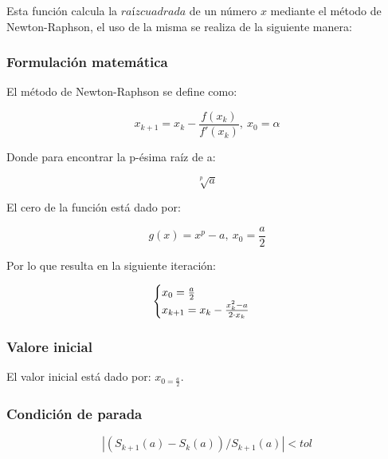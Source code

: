 \documentclass[10pt,a4paper]{article}
\begin{document}
	Esta función calcula la $raíz cuadrada$ de un número $x$ mediante el método de Newton-Raphson, el uso de la misma se realiza de la siguiente manera:
	
	\begin{center}
	\end{center}
	
	\subsubsection{Formulación matemática}
	
	El método de Newton-Raphson se define como:
	
	\begin{equation}\label{key19}
		x_{k+1} = x_{k} - \frac{f(x_{k})}{f'(x_{k})}, ~x_{0} = \alpha
	\end{equation}
	
	Donde para encontrar la p-ésima raíz de a:
	
	\begin{equation}\label{key20}
		\sqrt[p]{a}	
	\end{equation}

	El cero de la función está dado por:
	
	\begin{equation}\label{key21}
		g(x) = x^{p} - a, ~x_{0} = \frac{a}{2}
	\end{equation}

	Por lo que resulta en la siguiente iteración:
	
	\begin{align*}
		\centering
		\begin{cases}
			x_{0} = \frac{a}{2} \\
			x_{k+1} = x_{k} - \frac{x_{k}^{2} - a}{2\cdot x_{k}}
		\end{cases}
	\end{align*}
	
	
	\subsubsection{Valore inicial}
	El valor inicial está dado por: $x_{0 = \frac{a}{2}}$.
	\subsubsection{Condición de parada}
	
	\begin{equation}\label{key22}
		\left\lvert (S_{k+1}(a) - S_{k}(a)) / S_{k+1}(a) \right\lvert < tol
	\end{equation}
	
\end{document}
